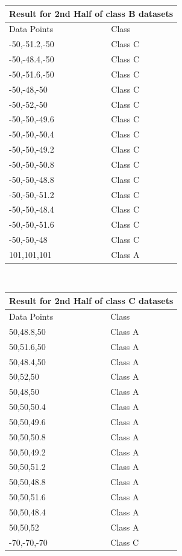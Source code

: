 \documentclass[letterpaper]{article}
\begin{document}
 \begin{tabular}{ |p{5cm}||p{5cm}| }
 \hline
 \multicolumn{2}{|c|}{Result for 2nd Half of class B datasets} \\
 \hline
Data Points& Class\\
 \hline
-50,-51.2,-50 & Class C \\
-50,-48.4,-50 & Class C \\
-50,-51.6,-50 & Class C \\
-50,-48,-50 & Class C \\
-50,-52,-50 & Class C \\
-50,-50,-49.6 & Class C \\
-50,-50,-50.4 & Class C \\
-50,-50,-49.2 & Class C \\
-50,-50,-50.8 & Class C \\
-50,-50,-48.8 & Class C \\
-50,-50,-51.2 & Class C \\
-50,-50,-48.4 & Class C \\
-50,-50,-51.6 & Class C \\
-50,-50,-48 & Class C \\
101,101,101 & Class A \\
 \hline
\end{tabular} \\

\begin{tabular}{ |p{5cm}||p{5cm}| }
 \hline
 \multicolumn{2}{|c|}{Result for 2nd Half of class C datasets} \\
 \hline
Data Points& Class\\
 \hline
50,48.8,50 & Class A \\
50,51.6,50 & Class A \\
50,48.4,50 & Class A \\
50,52,50 & Class A \\
50,48,50 & Class A \\
50,50,50.4 & Class A \\
50,50,49.6 & Class A \\
50,50,50.8 & Class A \\
50,50,49.2 & Class A \\
50,50,51.2 & Class A \\
50,50,48.8 & Class A \\
50,50,51.6 & Class A \\
50,50,48.4 & Class A \\
50,50,52 & Class A \\
-70,-70,-70 & Class C \\ 
 
 \hline
\end{tabular} \\
\end{document}
